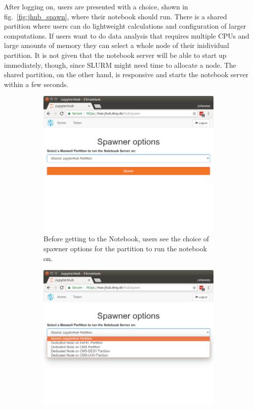 \documentclass[10pt]{scrartcl}
\begin{document}
After logging on, users are presented with a choice, shown in fig.~\ref{fig:jhub_spawn}, where their notebook should run. 
There is a shared partition where users can do lightweight calculations and configuration of larger computations.
If users want to do data analysis that requires multiple CPUs and large amounts of memory they can select a whole node of their inidividual partition. 
It is not given that the notebook server will be able to start up immediately, though, since SLURM might need time to allocate a node. 
The shared partition, on the other hand, is responsive and starts the notebook server within a few seconds.
%
\begin{figure}
  \centering
    \begin{subfigure}{0.45\textwidth} %
	  \includegraphics[width=\textwidth]{figures/jhub004.png}
	  \caption{Before getting to the Notebook, users see the choice of spawner options for the partition to run the notebook on.} %
  \end{subfigure}
  \vspace{1em} %
  \begin{subfigure}{0.45\textwidth} %
	  \includegraphics[width=\textwidth]{figures/jhub005.png}

\end{subfigure}
\end{figure}
\end{document}
